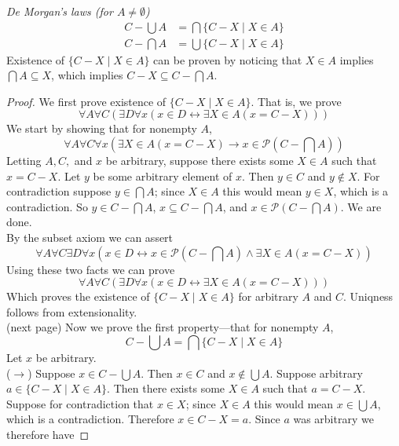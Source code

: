 \documentclass{report}
\begin{document}
\noindent\textit{De Morgan's laws (for $A\neq\emptyset$)}
\begin{align*}
C-\bigcup A&=\bigcap\{C-X\mid X\in A\}\\
C-\bigcap A&=\bigcup\{C-X\mid X\in A\}
\end{align*}
Existence of $\{C-X\mid X\in A\}$ can be proven by noticing that $X\in A$ implies $\bigcap A\subseteq X$, which implies $C-X\subseteq C-\bigcap A$.
\begin{proof}
We first prove existence of $\{C-X\mid X\in A\}$. That is, we prove
\begin{equation*}
\forall A\forall C(\exists D\forall x(x\in D\leftrightarrow\exists X\in A(x=C-X)))
\end{equation*}
We start by showing that for nonempty $A$,
\begin{equation*}
\forall A\forall C\forall x(\exists X\in A(x=C-X)\to x\in\mathscr P(C-\bigcap A))
\end{equation*}
Letting $A, C,$ and $x$ be arbitrary, suppose there exists some $X\in A$ such that $x=C-X$. Let $y$ be some arbitrary element of $x$. 
Then $y\in C$ and $y\notin X$. For contradiction suppose $y\in\bigcap A$; since $X\in A$ this would mean $y\in X$, which is a contradiction. So $y\in C-\bigcap A$, $x\subseteq C-\bigcap A$, and
$x\in\mathscr P(C-\bigcap A)$. We are done.\\
\indent By the subset axiom we can assert
\begin{equation*}
\forall A\forall C\exists D\forall x(x\in D\leftrightarrow x\in\mathscr P(C-\bigcap A)\land\exists X\in A(x=C-X))
\end{equation*}
Using these two facts we can prove
\begin{equation*}
\forall A\forall C(\exists D\forall x(x\in D\leftrightarrow\exists X\in A(x=C-X)))
\end{equation*}
Which proves the existence of $\{C-X\mid X\in A\}$ for arbitrary $A$ and $C$. Uniqness follows from extensionality.\\
(next page)\newpage
Now we prove the first property---that for nonempty $A$,
\begin{equation*}
C-\bigcup A=\bigcap\{C-X\mid X\in A\}
\end{equation*}
Let $x$ be arbitrary.\\
\indent($\rightarrow$) Suppose $x\in C-\bigcup A$. Then $x\in C$ and $x\notin\bigcup A$. 
Suppose arbitrary $a\in\{C-X\mid X\in A\}$. Then there exists some $X\in A$ such that 
$a=C-X$. Suppose for contradiction that $x\in X$; since $X\in A$ this would mean $x\in\bigcup A$, which is a contradiction. Therefore $x\in C-X=a$. Since $a$ was arbitrary we therefore have 

\end{proof}
\end{document}
